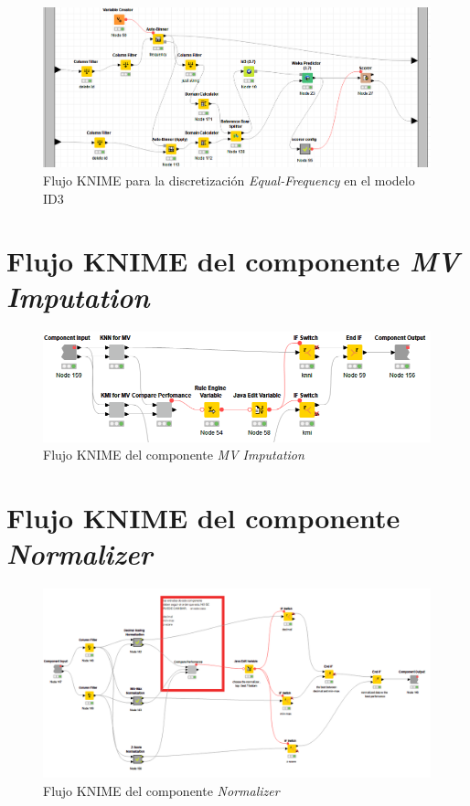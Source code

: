 \begin{figure}[H]
	\centering
	\includegraphics[width=\textwidth]{"figuras/anexos/ejemplo discretizacion freq id3"}
	\caption{Flujo KNIME para la discretización\textit{ Equal-Frequency} en el modelo ID3}
	\label{anex:ejemplo-discretizacion-freq-id3}
\end{figure}

\chapter{Flujo KNIME del componente\textit{ MV Imputation}} \label{aped:10}

\begin{figure}[H]
	\centering
	\includegraphics[width=\textwidth]{"figuras/anexos/MV Imputation"}
	\caption{Flujo KNIME del componente \textit{MV Imputation}}
	\label{anex:mv-imputation}
\end{figure}

\chapter{Flujo KNIME del componente \textit{Normalizer}} \label{aped:11}
	
\begin{figure}[H]
	\centering
	\includegraphics[width=\textwidth]{figuras/anexos/normalizer}
	\caption{Flujo KNIME del componente \textit{Normalizer}}
	\label{anex:normalizer}
\end{figure}
	

